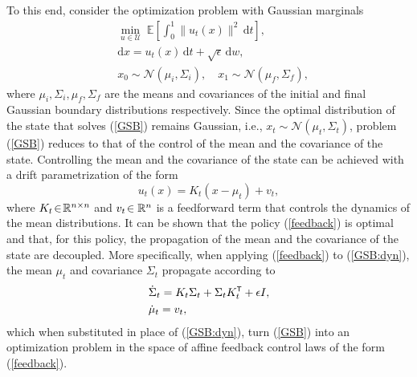 \documentclass[twoside]{article}
\renewcommand{\eqref}[1]{(\ref{#1})}
\renewcommand{\t}{^{\mbox{\tiny\sf T}}} %
\newcommand{\N}{\mathcal{N}}
\renewcommand{\E}{\mathbb{E}}
\renewcommand{\d}{\mathrm{d}}
\begin{document}
To this end, consider the optimization problem with Gaussian marginals
\begin{subequations} \label{GSB}
\begin{align}
& \min_{u \in \mathcal{U}} \; \E \left[ \int_{0}^{1}{ \| u_t(x) \|^2 \, \d t} \right], \label{GSB:cost} \\
& \d x = u_t(x)\, \d t + \sqrt{\epsilon}\, \d w, \label{GSB:dyn} \\
& x_0 \sim \N(\mu_i, \Sigma_i), \quad x_1 \sim \N(\mu_f, \Sigma_f), \label{GSB:BC}
\end{align}
\end{subequations}
%
where $\mu_i, \Sigma_i, \mu_f, \Sigma_f$ are the means and covariances of the initial and final Gaussian boundary distributions respectively. 
Since the optimal distribution of the state that solves \eqref{GSB} remains Gaussian, i.e., $x_t \sim \mathcal{N}(\mu_t, \Sigma_t)$, problem \eqref{GSB} reduces to that of the control of the mean and the covariance of the state. 
%
Controlling the mean and the covariance of the state can be achieved with a drift parametrization of the form
\begin{equation} \label{feedback}
    u_t(x) = K_t(x-\mu_t) + v_t,
\end{equation}
where $K_t \! \in \! {\mathbb{R}}^{n\times n}$ and $v_t \! \in {\mathbb{R}}^n$ is a feedforward term that controls the dynamics of the mean distributions.
It can be shown that the policy \eqref{feedback} is optimal and that, for this policy,
the propagation of the mean and the covariance of the state are decoupled. 
%
More specifically, when applying \eqref{feedback} to \eqref{GSB:dyn}, the mean $\mu_t$ and covariance $\Sigma_t$ propagate according to 
%
\begin{subequations}
\begin{align}
& \dot{\Sigma}_t = K_t \Sigma_t + \Sigma_t K_t\t + \epsilon I, \\
& \dot{\mu}_t = v_t,
\end{align}
\end{subequations}
which when substituted in place of \eqref{GSB:dyn}, turn \eqref{GSB} into an optimization problem in the space of affine feedback control laws of the form \eqref{feedback}.
\end{document}
